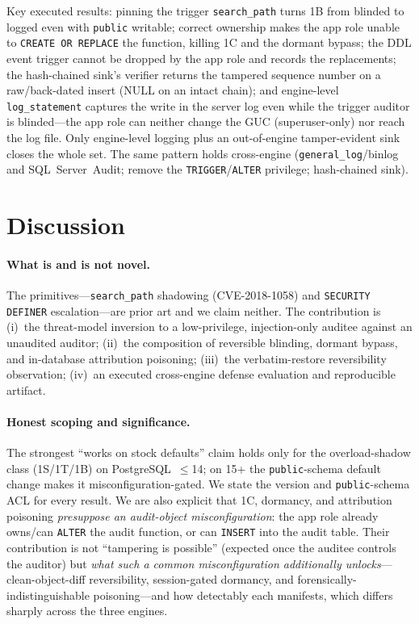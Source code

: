 \documentclass[11pt]{article}
\newcommand{\code}[1]{\texttt{#1}}
\begin{document}
Key executed results: pinning the trigger \code{search\_path} turns 1B from blinded to
logged even with \code{public} writable; correct ownership makes the app role unable to
\code{CREATE OR REPLACE} the function, killing 1C and the dormant bypass; the DDL event
trigger cannot be dropped by the app role and records the replacements; the hash-chained
sink's verifier returns the tampered sequence number on a raw/back-dated insert (NULL on an
intact chain); and engine-level \code{log\_statement} captures the write in the server log
even while the trigger auditor is blinded---the app role can neither change the GUC
(superuser-only) nor reach the log file. Only engine-level logging plus an out-of-engine
tamper-evident sink closes the whole set. The same pattern holds cross-engine
(\code{general\_log}/binlog and SQL~Server~Audit; remove the \code{TRIGGER}/\code{ALTER}
privilege; hash-chained sink).

\section{Discussion}
\paragraph{What is and is not novel.} The primitives---\code{search\_path} shadowing
(CVE-2018-1058) and \code{SECURITY DEFINER} escalation---are prior art and we claim neither.
The contribution is (i)~the threat-model inversion to a low-privilege, injection-only
auditee against an unaudited auditor; (ii)~the composition of reversible blinding, dormant
bypass, and in-database attribution poisoning; (iii)~the verbatim-restore reversibility
observation; (iv)~an executed cross-engine defense evaluation and reproducible artifact.

\paragraph{Honest scoping and significance.} The strongest ``works on stock defaults'' claim
holds only for the overload-shadow class (1S/1T/1B) on PostgreSQL~$\leq$14; on 15+ the
\code{public}-schema default change makes it misconfiguration-gated. We state the version and
\code{public}-schema ACL for every result. We are also explicit that 1C, dormancy, and
attribution poisoning \emph{presuppose an audit-object misconfiguration}: the app role already
owns/can \code{ALTER} the audit function, or can \code{INSERT} into the audit table. Their
contribution is not ``tampering is possible'' (expected once the auditee controls the auditor)
but \emph{what such a common misconfiguration additionally unlocks}---clean-object-diff
reversibility, session-gated dormancy, and forensically-indistinguishable poisoning---and how
detectably each manifests, which differs sharply across the three engines.
\end{document}
